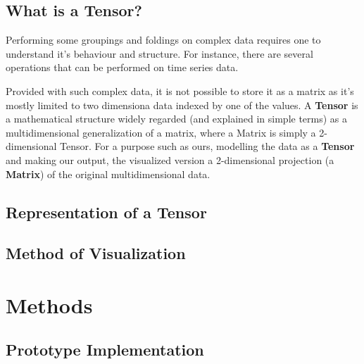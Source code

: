 \documentclass[11pt]{article}
\begin{document}
\subsection{What is a Tensor?}

Performing some groupings and foldings on complex data requires one to understand it's behaviour and structure. For instance, there are several operations that can be performed on time series data. 

Provided with such complex data, it is not possible to store it as a matrix as it's mostly limited to two dimensiona data indexed by one of the values. A \textbf{Tensor} is a mathematical structure widely regarded (and explained in simple terms) as a multidimensional generalization of a matrix, where a Matrix is simply a 2-dimensional Tensor. For a purpose such as ours, modelling the data as a \textbf{Tensor} and making our output, the visualized version a 2-dimensional projection (a \textbf{Matrix}) of the original multidimensional data.

\subsection{Representation of a Tensor}

\subsection{Method of Visualization}


\section{Methods}



\subsection {Prototype Implementation}
\end{document}
